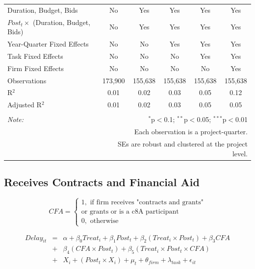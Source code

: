\documentclass[
]{article}
\begin{document}
\begin{table}[H]
\begin{tabular}{@{\extracolsep{-2pt}}lccccc}
Duration, Budget, Bids & No & Yes & Yes & Yes & Yes \\ 
$Post_t \times $  (Duration, Budget, Bids) & No & Yes & Yes & Yes & Yes \\ 
Year-Quarter Fixed Effects & No & No & Yes & Yes & Yes \\ 
Task Fixed Effects & No & No & No & Yes & Yes \\ 
Firm Fixed Effects & No & No & No & No & Yes \\ 
Observations & 173,900 & 155,638 & 155,638 & 155,638 & 155,638 \\ 
R$^{2}$ & 0.01 & 0.02 & 0.03 & 0.05 & 0.12 \\ 
Adjusted R$^{2}$ & 0.01 & 0.02 & 0.03 & 0.05 & 0.05 \\ 
\hline 
\hline \\[-1.8ex] 
\textit{Note:}  & \multicolumn{5}{r}{$^{*}$p$<$0.1; $^{**}$p$<$0.05; $^{***}$p$<$0.01} \\ 
 & \multicolumn{5}{r}{Each observation is a project-quarter.} \\ 
 & \multicolumn{5}{r}{SEs are robust and clustered at the project level.} \\ 
\end{tabular} 
\end{table}

\hypertarget{receives-contracts-and-financial-aid}{%
\subsection{Receives Contracts and Financial
Aid}\label{receives-contracts-and-financial-aid}}

\[ CFA = \begin{cases} 1, \text{ if firm receives "contracts and grants"}\\ 
                       \text{or grants or is a c8A participant}\\
0, \text{ otherwise} \end{cases}\]

\[ \begin{aligned}
Delay_{it} &=& \alpha+\beta_0 Treat_i + \beta_1 Post_t + \beta_2 (Treat_i \times Post_t) +\beta_3 CFA \\
&+& \beta_4 (CFA \times Post_t) + \beta_5 (Treat_i \times Post_t \times CFA) \\ 
&+&X_i + (Post_t \times X_i) + \mu_t + \theta_{firm} + \lambda_{task}+ \epsilon_{it}
\end{aligned}\]
\end{document}
